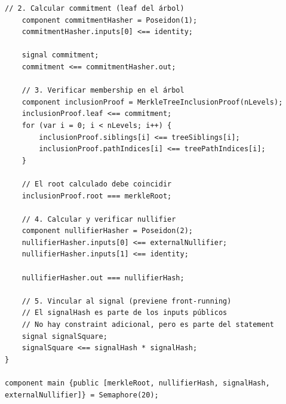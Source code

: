 \documentclass[11pt,a4paper,twoside]{book}
\theoremstyle{definition}
\theoremstyle{remark}
\begin{document}
\begin{lstlisting}[language=circom, caption={Circuito Semaphore simplificado}]
    // 2. Calcular commitment (leaf del árbol)
    component commitmentHasher = Poseidon(1);
    commitmentHasher.inputs[0] <== identity;
    
    signal commitment;
    commitment <== commitmentHasher.out;
    
    // 3. Verificar membership en el árbol
    component inclusionProof = MerkleTreeInclusionProof(nLevels);
    inclusionProof.leaf <== commitment;
    for (var i = 0; i < nLevels; i++) {
        inclusionProof.siblings[i] <== treeSiblings[i];
        inclusionProof.pathIndices[i] <== treePathIndices[i];
    }
    
    // El root calculado debe coincidir
    inclusionProof.root === merkleRoot;
    
    // 4. Calcular y verificar nullifier
    component nullifierHasher = Poseidon(2);
    nullifierHasher.inputs[0] <== externalNullifier;
    nullifierHasher.inputs[1] <== identity;
    
    nullifierHasher.out === nullifierHash;
    
    // 5. Vincular al signal (previene front-running)
    // El signalHash es parte de los inputs públicos
    // No hay constraint adicional, pero es parte del statement
    signal signalSquare;
    signalSquare <== signalHash * signalHash;
}

component main {public [merkleRoot, nullifierHash, signalHash, externalNullifier]} = Semaphore(20);
\end{lstlisting}
\end{document}
